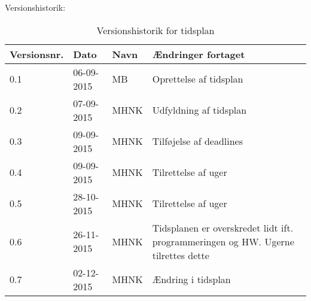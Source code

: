 \documentclass[landscape, 12pt, letterpaper]{article}
\begin{document}
\begin{table}[]
Versionshistorik:
\centering
\caption{Versionshistorik for tidsplan}
\label{my-label}
\begin{tabular}{|l|l|l|l|}
\hline
Versionsnr. & Dato       & Navn & Ændringer fortaget     \\ \hline
0.1         & 06-09-2015 & MB   & Oprettelse af tidsplan \\ \hline
0.2         & 07-09-2015 & MHNK & Udfyldning af tidsplan \\ \hline
0.3         & 09-09-2015 & MHNK & Tilføjelse af deadlines\\ \hline
0.4         & 09-09-2015 & MHNK & Tilrettelse af uger    \\ \hline
0.5         & 28-10-2015 & MHNK & Tilrettelse af uger    \\ \hline
0.6         & 26-11-2015 & MHNK & Tidsplanen er overskredet lidt ift. programmeringen og HW.
 Ugerne tilrettes dette     \\ \hline	
0.7         & 02-12-2015 & MHNK & Ændring i tidsplan    \\ \hline
\end{tabular}
\end{table}
\end{document}
